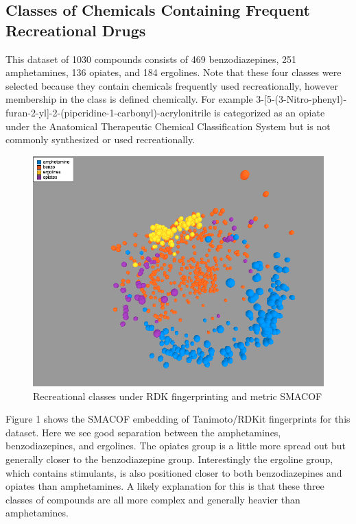 \documentclass[12pt]{article}
\begin{document}
\subsection{Classes of Chemicals Containing Frequent Recreational Drugs}
This dataset of 1030 compounds consists of 469 benzodiazepines, 251 amphetamines, 136 opiates, and 184 ergolines. Note that these four classes were selected because they contain chemicals frequently used recreationally, however membership in the class is defined chemically. For example 3-[5-(3-Nitro-phenyl)-furan-2-yl]-2-(piperidine-1-carbonyl)-acrylonitrile is categorized as an opiate under the Anatomical Therapeutic Chemical Classification System but is not commonly synthesized or used recreationally.

\begin{figure}[H]
  \centering
  \includegraphics[width=\textwidth]{rec-rdk-mds}
  \captionsetup{justification=centering}
  \caption{Recreational classes under RDK fingerprinting and metric SMACOF}
\end{figure}

Figure 1 shows the SMACOF embedding of Tanimoto/RDKit fingerprints for this dataset. Here we see good separation between the amphetamines, benzodiazepines,  and ergolines. The opiates group is a little more spread out but generally closer to the benzodiazepine group. Interestingly the ergoline group, which contains stimulants, is also positioned closer to both benzodiazepines and opiates than amphetamines. A likely explanation for this is that these three classes of compounds are all more complex and generally heavier than amphetamines.
\end{document}
